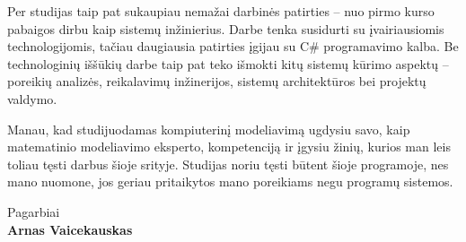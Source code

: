\documentclass[]{VUMIFTemplateClass}
\begin{document}
Per studijas taip pat sukaupiau nemažai darbinės patirties -- nuo pirmo kurso pabaigos dirbu kaip sistemų inžinierius. Darbe tenka susidurti su įvairiausiomis technologijomis, tačiau daugiausia patirties įgijau su C\# programavimo kalba. Be technologinių iššūkių darbe taip pat teko išmokti kitų sistemų kūrimo aspektų -- poreikių analizės, reikalavimų inžinerijos, sistemų architektūros bei projektų valdymo.

Manau, kad studijuodamas kompiuterinį modeliavimą ugdysiu savo, kaip matematinio modeliavimo eksperto, kompetenciją ir įgysiu žinių, kurios man leis toliau tęsti darbus šioje srityje. Studijas noriu tęsti būtent šioje programoje, nes mano nuomone, jos geriau pritaikytos mano poreikiams negu programų sistemos.

\vspace{1em}

Pagarbiai \\
\vspace{0.5em}
\textbf{Arnas Vaicekauskas} 

\printbibliography
\end{document}

